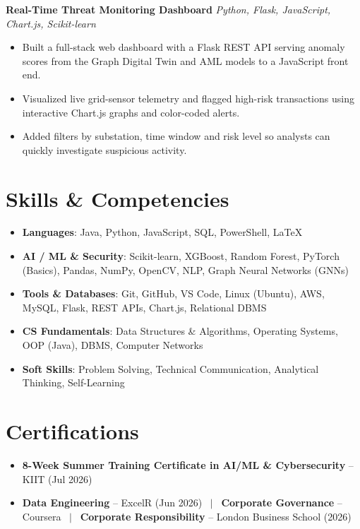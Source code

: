 \documentclass[a4paper,10pt]{article}
\begin{document}
\vspace{3.5pt}
\noindent\textbf{Real-Time Threat Monitoring Dashboard} \hfill \textit{Python, Flask, JavaScript, Chart.js, Scikit-learn}
\begin{itemize}
    \item Built a full-stack web dashboard with a Flask REST API serving anomaly scores from the Graph Digital Twin and AML models to a JavaScript front end.
    \item Visualized live grid-sensor telemetry and flagged high-risk transactions using interactive Chart.js graphs and color-coded alerts.
    \item Added filters by substation, time window and risk level so analysts can quickly investigate suspicious activity.
\end{itemize}

\section{Skills \& Competencies}
\begin{itemize}
    \item \textbf{Languages}: Java, Python, JavaScript, SQL, PowerShell, LaTeX
    \item \textbf{AI / ML \& Security}: Scikit-learn, XGBoost, Random Forest, PyTorch (Basics), Pandas, NumPy, OpenCV, NLP, Graph Neural Networks (GNNs)
    \item \textbf{Tools \& Databases}: Git, GitHub, VS Code, Linux (Ubuntu), AWS, MySQL, Flask, REST APIs, Chart.js, Relational DBMS
    \item \textbf{CS Fundamentals}: Data Structures \& Algorithms, Operating Systems, OOP (Java), DBMS, Computer Networks
    \item \textbf{Soft Skills}: Problem Solving, Technical Communication, Analytical Thinking, Self-Learning
\end{itemize}

\section{Certifications}
\begin{itemize}
    \item \textbf{8-Week Summer Training Certificate in AI/ML \& Cybersecurity} -- KIIT (Jul 2026)
    \item \textbf{Data Engineering} -- ExcelR (Jun 2026) \ $|$ \ \textbf{Corporate Governance} -- Coursera \ $|$ \ \textbf{Corporate Responsibility} -- London Business School (2026)
\end{itemize}
\end{document}
